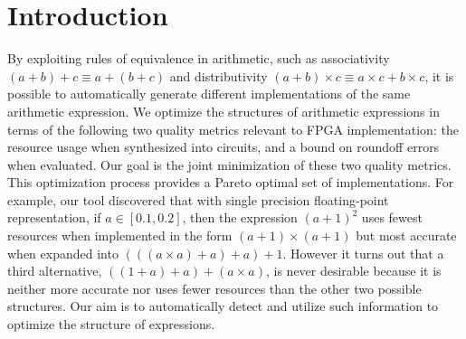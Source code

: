 \section{Introduction}
\label{so:sec:introduction}


By exploiting rules of equivalence in arithmetic, such as associativity $(a
+ b) + c \equiv a + (b + c)$ and distributivity $(a + b) \times c \equiv a
\times c + b \times c$, it is possible to automatically generate different
implementations of the same arithmetic expression.  We optimize the structures
of arithmetic expressions in terms of the following two quality metrics
relevant to FPGA implementation: the resource usage when synthesized into
circuits, and a bound on roundoff errors when evaluated. Our goal is the joint
minimization of these two quality metrics.  This optimization process provides
a Pareto optimal set of implementations.  For example, our tool discovered that
with single precision floating-point representation, if $a \in [0.1, 0.2]$,
then the expression ${(a + 1)}^2$ uses fewest resources when implemented in the
form $(a + 1) \times (a + 1)$ but most accurate when expanded into $(((a \times
a) + a) + a) + 1$.  However it turns out that a third alternative, $((1 + a)
+ a) + (a \times a)$, is never desirable because it is neither more accurate
nor uses fewer resources than the other two possible structures. Our aim is to
automatically detect and utilize such information to optimize the structure of
expressions.

